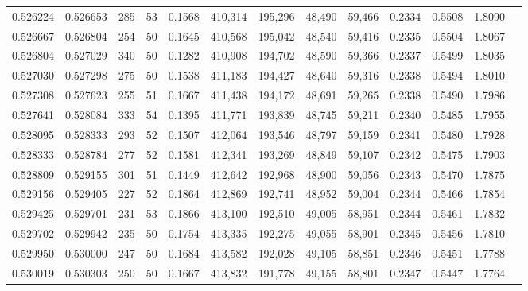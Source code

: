 \begin{tabular}{rrrrrrrrrrrrr}
0.526224 & 0.526653 &    285 &    53 &                                     0.1568 & 410,314 & 195,296 &  48,490 &  59,466 & 0.2334 & 0.5508 & 1.8090 \\
0.526667 & 0.526804 &    254 &    50 &                                     0.1645 & 410,568 & 195,042 &  48,540 &  59,416 & 0.2335 & 0.5504 & 1.8067 \\
0.526804 & 0.527029 &    340 &    50 &                                     0.1282 & 410,908 & 194,702 &  48,590 &  59,366 & 0.2337 & 0.5499 & 1.8035 \\
0.527030 & 0.527298 &    275 &    50 &                                     0.1538 & 411,183 & 194,427 &  48,640 &  59,316 & 0.2338 & 0.5494 & 1.8010 \\
0.527308 & 0.527623 &    255 &    51 &                                     0.1667 & 411,438 & 194,172 &  48,691 &  59,265 & 0.2338 & 0.5490 & 1.7986 \\
0.527641 & 0.528084 &    333 &    54 &                                     0.1395 & 411,771 & 193,839 &  48,745 &  59,211 & 0.2340 & 0.5485 & 1.7955 \\
0.528095 & 0.528333 &    293 &    52 &                                     0.1507 & 412,064 & 193,546 &  48,797 &  59,159 & 0.2341 & 0.5480 & 1.7928 \\
0.528333 & 0.528784 &    277 &    52 &                                     0.1581 & 412,341 & 193,269 &  48,849 &  59,107 & 0.2342 & 0.5475 & 1.7903 \\
0.528809 & 0.529155 &    301 &    51 &                                     0.1449 & 412,642 & 192,968 &  48,900 &  59,056 & 0.2343 & 0.5470 & 1.7875 \\
0.529156 & 0.529405 &    227 &    52 &                                     0.1864 & 412,869 & 192,741 &  48,952 &  59,004 & 0.2344 & 0.5466 & 1.7854 \\
0.529425 & 0.529701 &    231 &    53 &                                     0.1866 & 413,100 & 192,510 &  49,005 &  58,951 & 0.2344 & 0.5461 & 1.7832 \\
0.529702 & 0.529942 &    235 &    50 &                                     0.1754 & 413,335 & 192,275 &  49,055 &  58,901 & 0.2345 & 0.5456 & 1.7810 \\
0.529950 & 0.530000 &    247 &    50 &                                     0.1684 & 413,582 & 192,028 &  49,105 &  58,851 & 0.2346 & 0.5451 & 1.7788 \\
0.530019 & 0.530303 &    250 &    50 &                                     0.1667 & 413,832 & 191,778 &  49,155 &  58,801 & 0.2347 & 0.5447 & 1.7764 \\

\end{tabular}
